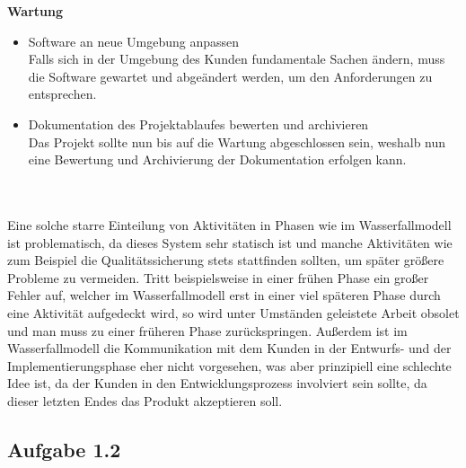 \documentclass[a4paper,graphics,11pt]{article}
\newcommand\aufgabe[1]{\subsection*{Aufgabe #1}}
\begin{document}
\textbf{Wartung}
\begin{itemize}
\item Software an neue Umgebung anpassen\\
Falls sich in der Umgebung des Kunden fundamentale Sachen ändern, muss die Software gewartet und abgeändert werden, um den Anforderungen zu entsprechen.
\item Dokumentation des Projektablaufes bewerten und archivieren\\
Das Projekt sollte nun bis auf die Wartung abgeschlossen sein, weshalb nun eine Bewertung und Archivierung der Dokumentation erfolgen kann.
\end{itemize} \ \\ \ \\
Eine solche starre Einteilung von Aktivitäten in Phasen wie im Wasserfallmodell ist problematisch, da dieses System sehr statisch ist und manche Aktivitäten wie 
zum Beispiel die Qualitätssicherung stets stattfinden sollten, um später größere Probleme zu vermeiden. Tritt beispielsweise in einer frühen Phase ein großer Fehler auf,
welcher im Wasserfallmodell erst in einer viel späteren Phase durch eine Aktivität aufgedeckt wird, so wird unter Umständen geleistete Arbeit obsolet und man muss
zu einer früheren Phase zurückspringen.
Außerdem ist im Wasserfallmodell die Kommunikation mit dem Kunden in der Entwurfs- und der Implementierungsphase eher nicht vorgesehen, was aber prinzipiell
eine schlechte Idee ist, da der Kunden in den Entwicklungsprozess involviert sein sollte, da dieser letzten Endes das Produkt akzeptieren soll.

\aufgabe{1.2}
\end{document}
